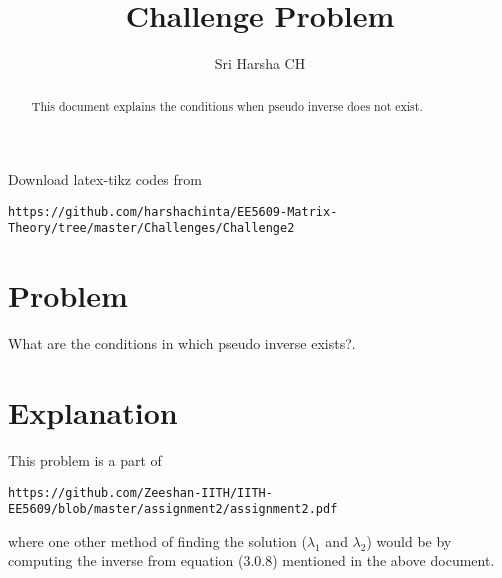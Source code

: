 \documentclass[journal,12pt,twocolumn]{IEEEtran}
\begin{document}
\renewcommand{\thefigure}{\theproblem}

\def\putbox#1#2#3{\makebox[0in][l]{\makebox[#1][l]{}\raisebox{\baselineskip}[0in][0in]{\raisebox{#2}[0in][0in]{#3}}}}
     \def\rightbox#1{\makebox[0in][r]{#1}}
     \def\centbox#1{\makebox[0in]{#1}}
     \def\topbox#1{\raisebox{-\baselineskip}[0in][0in]{#1}}
     \def\midbox#1{\raisebox{-0.5\baselineskip}[0in][0in]{#1}}
\vspace{3cm}
\title{Challenge Problem}
\author{Sri Harsha CH}

\maketitle
\newpage

\bigskip
\renewcommand{\thefigure}{\theenumi}
\renewcommand{\thetable}{\theenumi}

\begin{abstract}
This document explains the conditions when pseudo inverse does not exist.
\end{abstract}

Download latex-tikz codes from 
%
\begin{lstlisting}
https://github.com/harshachinta/EE5609-Matrix-Theory/tree/master/Challenges/Challenge2
\end{lstlisting}
%
\section{Problem}
What are the conditions in which pseudo inverse exists?.
\section{Explanation}
This problem is a part of
\begin{lstlisting}
https://github.com/Zeeshan-IITH/IITH-EE5609/blob/master/assignment2/assignment2.pdf
\end{lstlisting}
 where one other method of finding the solution ($\lambda_1$ and $\lambda_2$) would be by computing the inverse from equation (3.0.8) mentioned in the above document.\\
\end{document}
